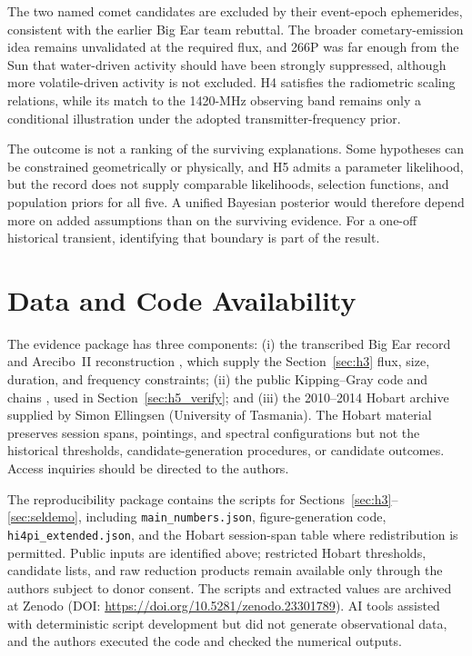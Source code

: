 \documentclass[crop]{CSL}
\begin{document}
The two named comet candidates are excluded by their event-epoch ephemerides, consistent with the earlier Big Ear team rebuttal. The broader cometary-emission idea remains unvalidated at the required flux, and 266P was far enough from the Sun that water-driven activity should have been strongly suppressed, although more volatile-driven activity is not excluded. H4 satisfies the radiometric scaling relations, while its match to the 1420-MHz observing band remains only a conditional illustration under the adopted transmitter-frequency prior.

The outcome is not a ranking of the surviving explanations. Some hypotheses can be constrained geometrically or physically, and H5 admits a parameter likelihood, but the record does not supply comparable likelihoods, selection functions, and population priors for all five. A unified Bayesian posterior would therefore depend more on added assumptions than on the surviving evidence. For a one-off historical transient, identifying that boundary is part of the result.

\section{Data and Code Availability}
\label{sec:availability}

The evidence package has three components: (i) the transcribed Big Ear record and Arecibo~II reconstruction \citep{mendez2025}, which supply the Section~\ref{sec:h3} flux, size, duration, and frequency constraints; (ii) the public Kipping--Gray code and chains \citep[\texttt{github.com/davidkipping/wow}]{kipping2022code}, used in Section~\ref{sec:h5_verify}; and (iii) the 2010--2014 Hobart archive supplied by Simon Ellingsen (University of Tasmania). The Hobart material preserves session spans, pointings, and spectral configurations but not the historical thresholds, candidate-generation procedures, or candidate outcomes. Access inquiries should be directed to the authors.


The reproducibility package contains the scripts for Sections~\ref{sec:h3}--\ref{sec:seldemo}, including \texttt{main\_numbers.json}, figure-generation code, \texttt{hi4pi\_extended.json}, and the Hobart session-span table where redistribution is permitted. Public inputs are identified above; restricted Hobart thresholds, candidate lists, and raw reduction products remain available only through the authors subject to donor consent. The scripts and extracted values are archived at Zenodo (DOI: \url{https://doi.org/10.5281/zenodo.23301789}). AI tools assisted with deterministic script development but did not generate observational data, and the authors executed the code and checked the numerical outputs.
\end{document}
